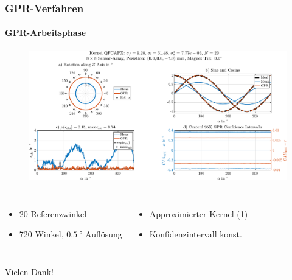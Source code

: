 \documentclass{beamer}
\begin{document}
\begin{frame}
\frametitle{GPR-Verfahren}
\framesubtitle{GPR-Arbeitsphase}
\begin{figure}
	\includegraphics[width=0.9\linewidth]{images/Rotation}
\end{figure}
\begin{columns}[c]
	\begin{itemize}
		\item<1-> 20 Referenzwinkel
		\item<2-> 720 Winkel, $\SI{0,5}{\degree}$ Auflösung
	\end{itemize}
	
	\begin{itemize}
		\item<3-> Approximierter Kernel (1)
		\item<4-> Konfidenzintervall konst.
	\end{itemize}
\end{columns}
\end{frame}

\begin{frame}
\Huge{\centerline{Vielen Dank!}}
\end{frame}

\end{document}
